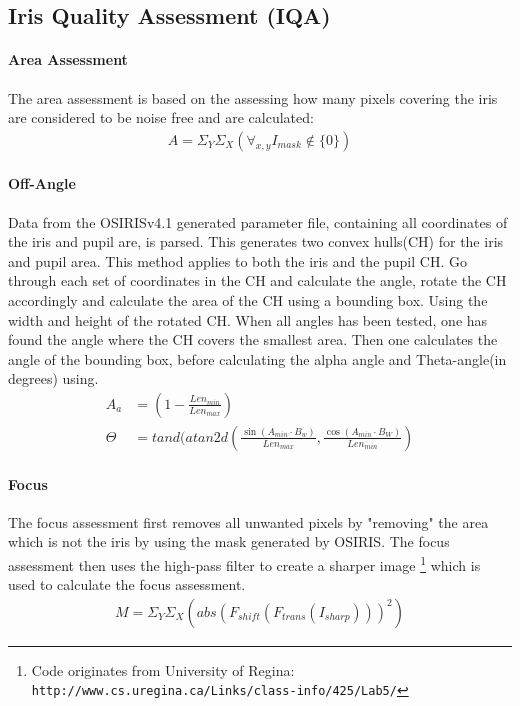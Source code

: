 \subsection{Iris Quality Assessment (IQA)}\label{sec:iqa}
\paragraph{Area Assessment}
The area assessment is based on the assessing how many pixels covering the iris
are considered to be noise free and are calculated:
\begin{align}
A = \Sigma_Y\Sigma_X( \forall_{x,y} I_{mask}\notin\{0\} ) 
\end{align}


\paragraph{Off-Angle}
Data from the OSIRISv4.1 generated parameter file, containing all coordinates of
the iris and pupil are, is parsed. This generates two convex hulls(CH) for the 
iris and pupil area. This method applies to both the iris and the pupil CH. Go 
through each set of coordinates in the CH and calculate the angle, rotate the
CH accordingly and calculate the area of the CH using a bounding box. Using 
the width and height of the rotated CH. When all angles has been tested, one has
found the angle where the CH covers the smallest area.
Then one calculates the angle of the bounding box, before calculating the alpha 
angle and Theta-angle(in degrees) using. 
\begin{align}
	A_a &= (1 - \frac{Len_{min}}{Len_{max}})\\
	\Theta &= tand( atan2d( \frac{\sin(A_{min} \cdot B_w)}{Len_{max}}, \frac{\cos(A_{min} \cdot B_W)}{Len_{min}} )
\end{align}


\paragraph{Focus}
The focus assessment first removes all unwanted pixels by "removing" the area
which is not the iris by using the mask generated by OSIRIS. The focus 
assessment then uses the high-pass filter to create a sharper image
\footnote{Code originates from University of Regina: \texttt{http://www.cs.uregina.ca/Links/class-info/425/Lab5/}} 
which is used to calculate the focus assessment.
\begin{align}
M = \Sigma_Y\Sigma_X( abs( F_{shift}( F_{trans}( I_{sharp} ) ) )^2 ) 
\end{align}


